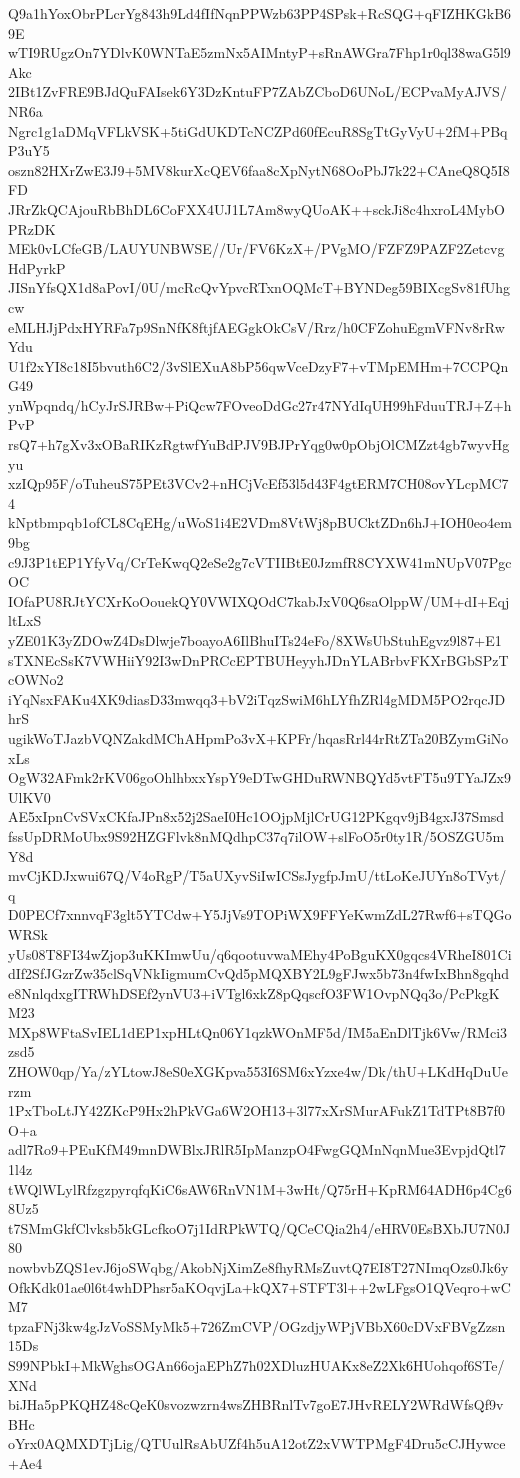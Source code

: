 Q9a1hYoxObrPLcrYg843h9Ld4fIfNqnPPWzb63PP4SPsk+RcSQG+qFIZHKGkB69E
wTI9RUgzOn7YDlvK0WNTaE5zmNx5AIMntyP+sRnAWGra7Fhp1r0ql38waG5l9Akc
2IBt1ZvFRE9BJdQuFAIsek6Y3DzKntuFP7ZAbZCboD6UNoL/ECPvaMyAJVS/NR6a
Ngrc1g1aDMqVFLkVSK+5tiGdUKDTcNCZPd60fEcuR8SgTtGyVyU+2fM+PBqP3uY5
oszn82HXrZwE3J9+5MV8kurXcQEV6faa8cXpNytN68OoPbJ7k22+CAneQ8Q5I8FD
JRrZkQCAjouRbBhDL6CoFXX4UJ1L7Am8wyQUoAK++sckJi8c4hxroL4MybOPRzDK
MEk0vLCfeGB/LAUYUNBWSE//Ur/FV6KzX+/PVgMO/FZFZ9PAZF2ZetcvgHdPyrkP
JISnYfsQX1d8aPovI/0U/mcRcQvYpvcRTxnOQMcT+BYNDeg59BIXcgSv81fUhgcw
eMLHJjPdxHYRFa7p9SnNfK8ftjfAEGgkOkCsV/Rrz/h0CFZohuEgmVFNv8rRwYdu
U1f2xYI8c18I5bvuth6C2/3vSlEXuA8bP56qwVceDzyF7+vTMpEMHm+7CCPQnG49
ynWpqndq/hCyJrSJRBw+PiQcw7FOveoDdGc27r47NYdIqUH99hFduuTRJ+Z+hPvP
rsQ7+h7gXv3xOBaRIKzRgtwfYuBdPJV9BJPrYqg0w0pObjOlCMZzt4gb7wyvHgyu
xzIQp95F/oTuheuS75PEt3VCv2+nHCjVcEf53l5d43F4gtERM7CH08ovYLcpMC74
kNptbmpqb1ofCL8CqEHg/uWoS1i4E2VDm8VtWj8pBUCktZDn6hJ+IOH0eo4em9bg
c9J3P1tEP1YfyVq/CrTeKwqQ2eSe2g7cVTIIBtE0JzmfR8CYXW41mNUpV07PgcOC
IOfaPU8RJtYCXrKoOouekQY0VWIXQOdC7kabJxV0Q6saOlppW/UM+dI+EqjltLxS
yZE01K3yZDOwZ4DsDlwje7boayoA6IlBhuITs24eFo/8XWsUbStuhEgvz9l87+E1
sTXNEcSsK7VWHiiY92I3wDnPRCcEPTBUHeyyhJDnYLABrbvFKXrBGbSPzTcOWNo2
iYqNsxFAKu4XK9diasD33mwqq3+bV2iTqzSwiM6hLYfhZRl4gMDM5PO2rqcJDhrS
ugikWoTJazbVQNZakdMChAHpmPo3vX+KPFr/hqasRrl44rRtZTa20BZymGiNoxLs
OgW32AFmk2rKV06goOhlhbxxYspY9eDTwGHDuRWNBQYd5vtFT5u9TYaJZx9UlKV0
AE5xIpnCvSVxCKfaJPn8x52j2SaeI0Hc1OOjpMjlCrUG12PKgqv9jB4gxJ37Smsd
fssUpDRMoUbx9S92HZGFlvk8nMQdhpC37q7ilOW+slFoO5r0ty1R/5OSZGU5mY8d
mvCjKDJxwui67Q/V4oRgP/T5aUXyvSiIwICSsJygfpJmU/ttLoKeJUYn8oTVyt/q
D0PECf7xnnvqF3glt5YTCdw+Y5JjVs9TOPiWX9FFYeKwmZdL27Rwf6+sTQGoWRSk
yUs08T8FI34wZjop3uKKImwUu/q6qootuvwaMEhy4PoBguKX0gqcs4VRheI801Ci
dIf2SfJGzrZw35clSqVNkIigmumCvQd5pMQXBY2L9gFJwx5b73n4fwIxBhn8gqhd
e8NnlqdxgITRWhDSEf2ynVU3+iVTgl6xkZ8pQqscfO3FW1OvpNQq3o/PcPkgKM23
MXp8WFtaSvIEL1dEP1xpHLtQn06Y1qzkWOnMF5d/IM5aEnDlTjk6Vw/RMci3zsd5
ZHOW0qp/Ya/zYLtowJ8eS0eXGKpva553I6SM6xYzxe4w/Dk/thU+LKdHqDuUerzm
1PxTboLtJY42ZKcP9Hx2hPkVGa6W2OH13+3l77xXrSMurAFukZ1TdTPt8B7f0O+a
adl7Ro9+PEuKfM49mnDWBlxJRlR5IpManzpO4FwgGQMnNqnMue3EvpjdQtl71l4z
tWQlWLylRfzgzpyrqfqKiC6sAW6RnVN1M+3wHt/Q75rH+KpRM64ADH6p4Cg68Uz5
t7SMmGkfClvksb5kGLcfkoO7j1IdRPkWTQ/QCeCQia2h4/eHRV0EsBXbJU7N0J80
nowbvbZQS1evJ6joSWqbg/AkobNjXimZe8fhyRMsZuvtQ7EI8T27NImqOzs0Jk6y
OfkKdk01ae0l6t4whDPhsr5aKOqvjLa+kQX7+STFT3l++2wLFgsO1QVeqro+wCM7
tpzaFNj3kw4gJzVoSSMyMk5+726ZmCVP/OGzdjyWPjVBbX60cDVxFBVgZzsn15Ds
S99NPbkI+MkWghsOGAn66ojaEPhZ7h02XDluzHUAKx8eZ2Xk6HUohqof6STe/XNd
biJHa5pPKQHZ48cQeK0svozwzrn4wsZHBRnlTv7goE7JHvRELY2WRdWfsQf9vBHc
oYrx0AQMXDTjLig/QTUulRsAbUZf4h5uA12otZ2xVWTPMgF4Dru5cCJHywce+Ae4
